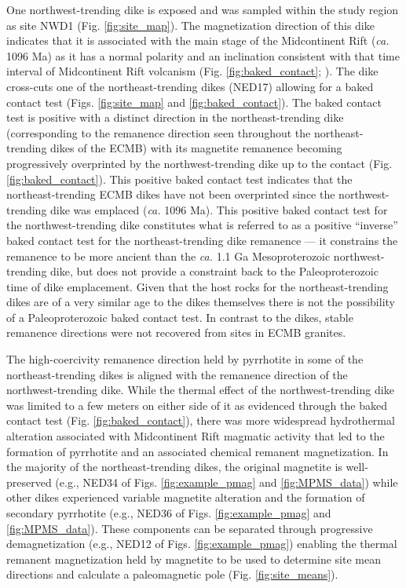 \documentclass[draft]{agujournal2019}
\begin{document}
One northwest-trending dike is exposed and was sampled within the study region as site NWD1 (Fig. \ref{fig:site_map}). The magnetization direction of this dike indicates that it is associated with the main stage of the Midcontinent Rift (\textit{ca.} 1096 Ma) as it has a normal polarity and an inclination consistent with that time interval of Midcontinent Rift volcanism (Fig. \ref{fig:baked_contact}; ). The dike cross-cuts one of the northeast-trending dikes (NED17) allowing for a baked contact test (Figs. \ref{fig:site_map} and \ref{fig:baked_contact}). The baked contact test is positive with a distinct direction in the northeast-trending dike (corresponding to the remanence direction seen throughout the northeast-trending dikes of the ECMB) with its magnetite remanence becoming progressively overprinted by the northwest-trending dike up to the contact (Fig. \ref{fig:baked_contact}). This positive baked contact test indicates that the northeast-trending ECMB dikes have not been overprinted since the northwest-trending dike was emplaced (\textit{ca.} 1096 Ma). This positive baked contact test for the northwest-trending dike constitutes what is referred to as a positive ``inverse'' baked contact test for the northeast-trending dike remanence --- it constrains the remanence to be more ancient than the \textit{ca.} 1.1 Ga Mesoproterozoic northwest-trending dike, but does not provide a constraint back to the Paleoproterozoic time of dike emplacement. Given that the host rocks for the northeast-trending dikes are of a very similar age to the dikes themselves there is not the possibility of a Paleoproterozoic baked contact test. In contrast to the dikes, stable remanence directions were not recovered from sites in ECMB granites. 

The high-coercivity remanence direction held by pyrrhotite in some of the northeast-trending dikes is aligned with the remanence direction of the northwest-trending dike. While the thermal effect of the northwest-trending dike was limited to a few meters on either side of it as evidenced through the baked contact test (Fig. \ref{fig:baked_contact}), there was more widespread hydrothermal alteration associated with Midcontinent Rift magmatic activity that led to the formation of pyrrhotite and an associated chemical remanent magnetization. In the majority of the northeast-trending dikes, the original magnetite is well-preserved (e.g., NED34 of Figs. \ref{fig:example_pmag} and \ref{fig:MPMS_data}) while other dikes experienced variable magnetite alteration and the formation of secondary pyrrhotite (e.g., NED36 of Figs. \ref{fig:example_pmag} and \ref{fig:MPMS_data}). These components can be separated through progressive demagnetization (e.g., NED12 of Figs. \ref{fig:example_pmag}) enabling the thermal remanent magnetization held by magnetite to be used to determine site mean directions and calculate a paleomagnetic pole (Fig. \ref{fig:site_means}).
\end{document}
